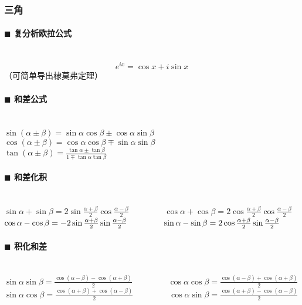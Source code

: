 \subsubsection{三角}
\paragraph{$\blacksquare$ 复分析欧拉公式}
\noindent \\
$$e^{ix}=\cos x+i\sin x$$（可简单导出棣莫弗定理）
\paragraph{$\blacksquare$ 和差公式}
\noindent \\
$\sin(\alpha \pm \beta )=\sin \alpha \cos \beta \pm \cos \alpha \sin \beta$~~~~~~~~
$\cos(\alpha \pm \beta )=\cos \alpha \cos \beta \mp \sin \alpha \sin \beta$\\
$\tan(\alpha \pm \beta )={\frac{\tan \alpha \pm \tan \beta }{1\mp \tan \alpha \tan \beta }}$\\
\paragraph{$\blacksquare$ 和差化积}
\noindent \\
$\sin \alpha +\sin \beta =2\sin {\frac  {\alpha +\beta }{2}}\cos {\frac  {\alpha -\beta }{2}}$~~~~~~~~
$\cos \alpha +\cos \beta =2\cos {\frac  {\alpha +\beta }{2}}\cos {\frac  {\alpha -\beta }{2}}$\\
$\cos \alpha -\cos \beta =-2\sin {\alpha +\beta  \over 2}\sin {\alpha -\beta  \over 2}$~~~~~~~~
$\sin \alpha -\sin \beta =2\cos {\alpha +\beta  \over 2}\sin {\alpha -\beta  \over 2}$\\
\paragraph{$\blacksquare$ 积化和差}
\noindent \\
$\sin \alpha \sin \beta =\frac{\cos(\alpha -\beta )-\cos(\alpha +\beta )}{2}$~~~~~~~~
$\cos \alpha \cos \beta =\frac{\cos(\alpha -\beta )+\cos(\alpha +\beta )}{2}$\\
$\sin \alpha \cos \beta =\frac{\cos(\alpha +\beta )+\cos(\alpha -\beta )}{2}$~~~~~~~~
$\cos \alpha \sin \beta =\frac{\cos(\alpha +\beta )-\cos(\alpha -\beta )}{2}$\\
